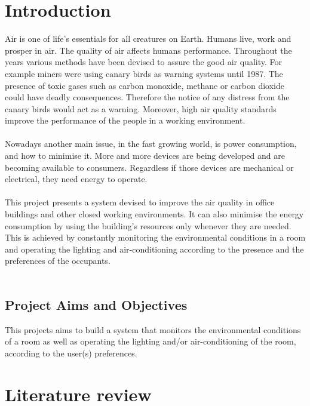 \documentclass[12pt,a4paper]{report}
\begin{document}
\chapter{Introduction}
%
Air is one of life's essentials for all creatures on Earth. Humans live, work and prosper in air. The quality of air affects humans performance. Throughout the years various methods have been devised to assure the good air quality. For example miners were using canary birds as warning systems until 1987. The presence of toxic gases such as carbon monoxide, methane or carbon dioxide could have deadly consequences. Therefore the notice of any distress from the canary birds would act as a warning. Moreover, high air quality standards improve the performance of the people in a working environment.\\
\ \\
Nowadays another main issue, in the fast growing world, is power consumption, and how to minimise it. More and more devices are being developed and are becoming available to consumers. Regardless if those devices are mechanical or electrical, they need energy to operate.\\
\ \\
This project presents a system devised to improve the air quality in office buildings and other closed working environments. It can also minimise the energy consumption by using the building's resources only whenever they are needed. This is achieved by constantly monitoring the environmental conditions in a room and operating the lighting and air-conditioning according to the presence and the preferences of the occupants.\\
\ \\
\section{Project Aims and Objectives}
This projects aims to build a system that monitors the environmental conditions of a room as well as operating the lighting and/or air-conditioning of the room, according to the user(s) preferences. 
%
\newpage
\chapter{Literature review}
%
\end{document}
